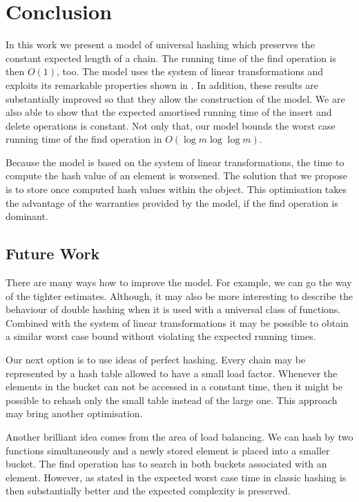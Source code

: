 \chapter{Conclusion}
In this work we present a model of universal hashing which preserves the constant expected length of a chain. The running time of the find operation is then $O(1)$, too. The model uses the system of linear transformations and exploits its remarkable properties shown in \cite{DBLP:journals/jacm/AlonDMPT99}. In addition, these results are substantially improved so that they allow the construction of the model. We are also able to show that the expected amortised running time of the insert and delete operations is constant. Not only that, our model bounds the worst case running time of the find operation in $O(\log m \log \log m)$. 

Because the model is based on the system of linear transformations, the time to compute the hash value of an element is worsened. The solution that we propose is to store once computed hash values within the object. This optimisation takes the advantage of the warranties provided by the model, if the find operation is dominant. 

\section{Future Work}
There are many ways how to improve the model. For example, we can go the way of the tighter estimates. Although, it may also be more interesting to describe the behaviour of double hashing when it is used with a universal class of functions. Combined with the system of linear transformations it may be possible to obtain a similar worst case bound without violating the expected running times. 

Our next option is to use ideas of perfect hashing. Every chain may be represented by a hash table allowed to have a small load factor. Whenever the elements in the bucket can not be accessed in a constant time, then it might be possible to rehash only the small table instead of the large one. This approach may bring another optimisation.

Another brilliant idea comes from the area of load balancing. We can hash by two functions simultaneously and a newly stored element is placed into a smaller bucket. The find operation has to search in both buckets associated with an element. However, as stated in \cite{1076315} the expected worst case time in classic hashing is then substantially better and the expected complexity is preserved.

